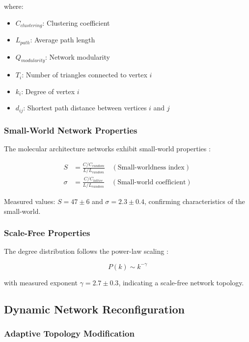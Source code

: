 \documentclass[12pt,a4paper]{article}
\begin{document}
where:
\begin{itemize}
\item $C_{clustering}$: Clustering coefficient
\item $L_{path}$: Average path length  
\item $Q_{modularity}$: Network modularity
\item $T_i$: Number of triangles connected to vertex $i$
\item $k_i$: Degree of vertex $i$
\item $d_{ij}$: Shortest path distance between vertices $i$ and $j$
\end{itemize}

\subsubsection{Small-World Network Properties}

The molecular architecture networks exhibit small-world properties \cite{watts1998collective}:

\begin{align}
S &= \frac{C/C_{random}}{L/L_{random}} \quad (\text{Small-worldness index}) \\
\sigma &= \frac{C/C_{lattice}}{L/L_{random}} \quad (\text{Small-world coefficient})
\end{align}

Measured values: $S = 47 \pm 6$ and $\sigma = 2.3 \pm 0.4$, confirming characteristics of the small-world.

\subsubsection{Scale-Free Properties}

The degree distribution follows the power-law scaling \cite{barabasi1999emergence}:

\begin{equation}
P(k) \sim k^{-\gamma}
\end{equation}

with measured exponent $\gamma = 2.7 \pm 0.3$, indicating a scale-free network topology.

\subsection{Dynamic Network Reconfiguration}

\subsubsection{Adaptive Topology Modification}
\end{document}

